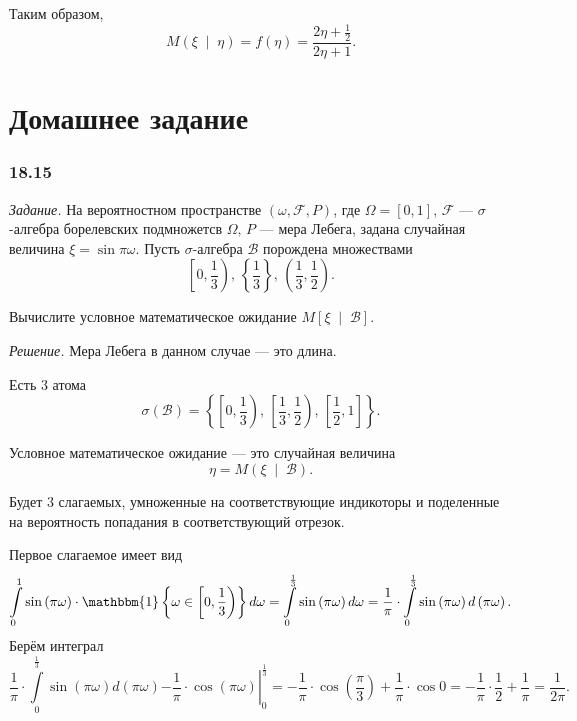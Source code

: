 Таким образом,
$$M \left( \xi \; \middle| \; \eta \right) =
  f \left( \eta \right) =
  \frac{2 \eta + \frac{1}{2}}{2 \eta + 1}.$$

\section*{Домашнее задание}

\subsubsection*{18.15}

\textit{Задание.}
На вероятностном пространстве $ \left( \omega, \mathcal{F}, P \right) $,
где $ \Omega = \left[ 0, 1 \right], \, \mathcal{F}$ ---
$ \sigma $-алгебра борелевских подмножетсв $ \Omega, \, P$ --- мера Лебега,
задана случайная величина $ \xi = \sin \pi \omega $.
Пусть $ \sigma $-алгебра $ \mathcal{B}$ порождена множествами
$$ \left[0, \frac{1}{3} \right), \,
  \left\{ \frac{1}{3} \right\}, \,
  \left( \frac{1}{3}, \frac{1}{2} \right).$$

Вычислите условное математическое ожидание $M \left[ \xi \; \middle| \; \mathcal{B} \right] $.

\textit{Решение.} Мера Лебега в данном случае --- это длина.

Есть 3 атома
$$ \sigma \left( \mathcal{B} \right) =
  \left\{
    \left[ 0, \frac{1}{3} \right), \,
    \left[ \frac{1}{3}, \frac{1}{2} \right), \,
    \left[ \frac{1}{2}, 1 \right]
  \right\}.$$

Условное математическое ожидание ---
это случайная величина
$$ \eta =
  M \left( \xi \; \middle| \; \mathcal{B} \right).$$

Будет 3 слагаемых,
умноженные на соответствующие
индикоторы и поделенные на вероятность попадания в соответствующий отрезок.

Первое слагаемое имеет вид
$$ \int \limits_0^1
  \sin \left( \pi \omega \right) \cdot
  \mathbbm{1} \left\{ \omega \in \left[ 0, \frac{1}{3} \right) \right\} d \omega =
  \int \limits_0^{ \frac{1}{3}} \sin \left( \pi \omega \right) d \omega =
  \frac{1}{ \pi } \cdot
  \int \limits_0^{ \frac{1}{3}} \sin \left( \pi \omega \right) d \left( \pi \omega \right).$$
Берём интеграл
$$ \frac{1}{ \pi } \cdot
  \int \limits_0^{ \frac{1}{3}} \sin \left( \pi \omega \right) d \left( \pi \omega \right)
  \left. - \frac{1}{ \pi } \cdot \cos \left( \pi \omega \right) \right|_0^{ \frac{1}{3}} =
  - \frac{1}{ \pi } \cdot \cos \left( \frac{ \pi }{3} \right) + \frac{1}{ \pi } \cdot \cos 0=
  - \frac{1}{ \pi } \cdot \frac{1}{2} + \frac{1}{ \pi } =
  \frac{1}{2 \pi }.$$

